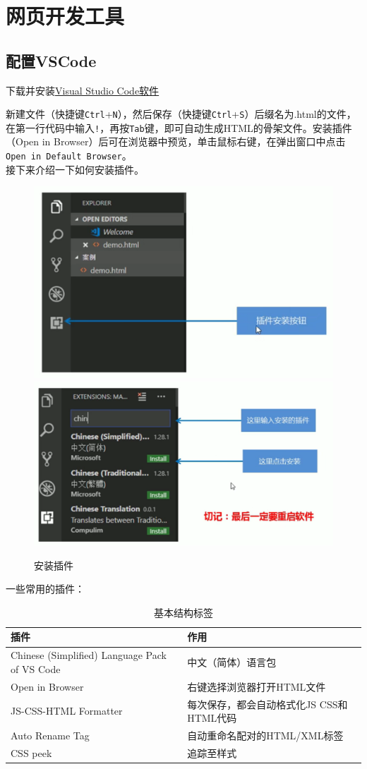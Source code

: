 \documentclass[
]{book}
\begin{document}
\hypertarget{ux7f51ux9875ux5f00ux53d1ux5de5ux5177}{%
\chapter{网页开发工具}\label{ux7f51ux9875ux5f00ux53d1ux5de5ux5177}}

\hypertarget{ux914dux7f6evscode}{%
\section{配置VSCode}\label{ux914dux7f6evscode}}

下载并安装\href{https://code.visualstudio.com/download}{Visual Studio Code软件}

新建文件（快捷键\texttt{Ctrl}+\texttt{N}），然后保存（快捷键\texttt{Ctrl}+\texttt{S}）后缀名为.html的文件，在第一行代码中输入\texttt{!}，再按\texttt{Tab}键，即可自动生成HTML的骨架文件。安装插件（Open in Browser）后可在浏览器中预览，单击鼠标右键，在弹出窗口中点击\texttt{Open\ in\ Default\ Browser}。\\
接下来介绍一下如何安装插件。

\begin{figure}

{\centering \includegraphics[width=0.5\linewidth]{fig/1-4} \includegraphics[width=0.5\linewidth]{fig/1-5} 

}

\caption{安装插件}\label{fig:unnamed-chunk-1}
\end{figure}

一些常用的插件：

\begin{table}

\caption{\label{tab:unnamed-chunk-2}基本结构标签}
\centering
\begin{tabular}[t]{ll}
\toprule
插件 & 作用\\
\midrule
Chinese (Simplified) Language Pack of VS Code & 中文（简体）语言包\\
Open in Browser & 右键选择浏览器打开HTML文件\\
JS-CSS-HTML Formatter & 每次保存，都会自动格式化JS CSS和HTML代码\\
Auto Rename Tag & 自动重命名配对的HTML/XML标签\\
CSS peek & 追踪至样式\\
\bottomrule
\end{tabular}
\end{table}
\end{document}
